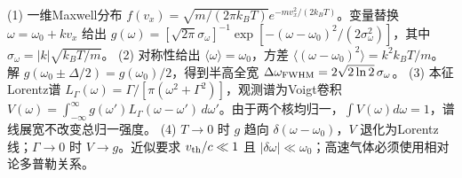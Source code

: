 (1) 一维Maxwell分布 \(f(v_x)=\sqrt{m/(2\pi k_BT)}e^{-mv_x^2/(2k_BT)}\)。变量替换 \(\omega=\omega_0+kv_x\) 给出 \(g(\omega)=[\sqrt{2\pi}\sigma_\omega]^{-1}\exp[-(\omega-\omega_0)^2/(2\sigma_\omega^2)]\)，其中 \(\sigma_\omega=|k|\sqrt{k_BT/m}\)。
(2) 对称性给出 \(\langle\omega\rangle=\omega_0\)，方差 \(\langle(\omega-\omega_0)^2\rangle=k^2k_BT/m\)。解 \(g(\omega_0\pm\Delta/2)=g(\omega_0)/2\)，得到半高全宽 \(\Delta\omega_{\rm FWHM}=2\sqrt{2\ln2}\,\sigma_\omega\)。
(3) 本征Lorentz谱 \(L_\Gamma(\omega)=\Gamma/[\pi(\omega^2+\Gamma^2)]\)，观测谱为Voigt卷积 \(V(\omega)=\int_{-\infty}^\infty g(\omega')L_\Gamma(\omega-\omega')\,d\omega'\)。由于两个核均归一，\(\int V(\omega)d\omega=1\)，谱线展宽不改变总归一强度。
(4) \(T\to0\) 时 \(g\) 趋向 \(\delta(\omega-\omega_0)\)，\(V\) 退化为Lorentz线；\(\Gamma\to0\) 时 \(V\to g\)。近似要求 \(v_{\rm th}/c\ll1\) 且 \(|\delta\omega|\ll\omega_0\)；高速气体必须使用相对论多普勒关系。
